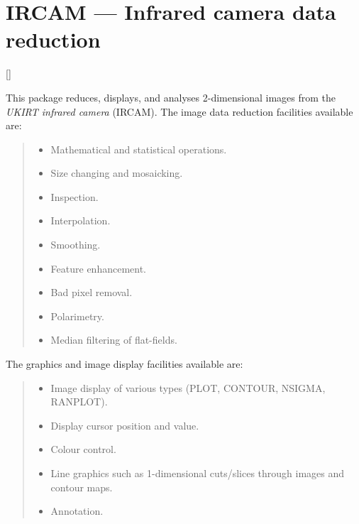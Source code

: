 \newpage

\section{IRCAM --- Infrared camera data reduction}

\vspace{-11mm}

\hfill []

\vspace{5mm}

This package reduces, displays, and analyses 2-dimensional images from the
{\em UKIRT infrared camera} (IRCAM).
The image data reduction facilities available are:

{\small
\begin{quote}
\begin{itemize}
\item Mathematical and statistical operations.
\item Size changing and mosaicking.
\item Inspection.
\item Interpolation.
\item Smoothing.
\item Feature enhancement.
\item Bad pixel removal.
\item Polarimetry.
\item Median filtering of flat-fields.
\end{itemize}
\end{quote}
}

The graphics and image display facilities available are:

{\small
\begin{quote}
\begin{itemize}
\item Image display of various types (PLOT, CONTOUR, NSIGMA, RANPLOT).
\item Display cursor position and value.
\item Colour control.
\item Line graphics such as 1-dimensional cuts/slices through images and
 contour maps.
\item Annotation.
\end{itemize}
\end{quote}
}

